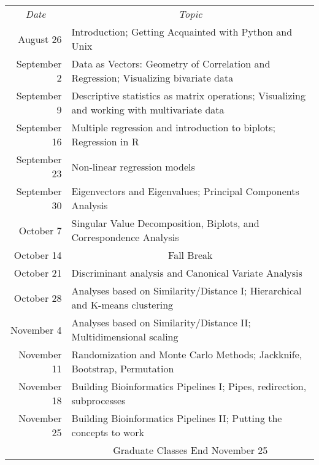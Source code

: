 \documentclass[11pt,letterpaper]{article}
\begin{document}
\renewcommand{\arraystretch}{1.4}
\begin{center}
\begin{tabular}{rp{5.5in}}
\multicolumn{1}{c}{{\sl Date}} & \multicolumn{1}{c}{{\sl Topic}} \\

August 26 & Introduction; Getting Acquainted with Python and Unix \\
September 2 & Data as Vectors: Geometry of Correlation and Regression; Visualizing bivariate data\\
September 9 & Descriptive statistics as matrix operations; Visualizing and working with multivariate data\\
September 16 & Multiple regression and introduction to biplots; Regression in R\\
September 23 & Non-linear regression models\\
September 30 & Eigenvectors and Eigenvalues; Principal Components Analysis \\
October 7 & Singular Value Decomposition, Biplots, and Correspondence Analysis\\
October 14 & \multicolumn{1}{c}{{\sc Fall Break}} \\
October 21 & Discriminant analysis and Canonical Variate Analysis\\
October 28 & Analyses based on Similarity/Distance I; Hierarchical and K-means clustering\\
November 4 & Analyses based on Similarity/Distance II; Multidimensional scaling\\
November 11 & Randomization and Monte Carlo Methods; Jackknife, Bootstrap, Permutation\\
November 18 & Building Bioinformatics Pipelines I; Pipes, redirection, subprocesses \\
November 25 & Building Bioinformatics Pipelines II; Putting the concepts to work \\

& \multicolumn{1}{c}{{\sc Graduate Classes End November 25}} \\
\end{tabular}
\end{center}
\end{document}
